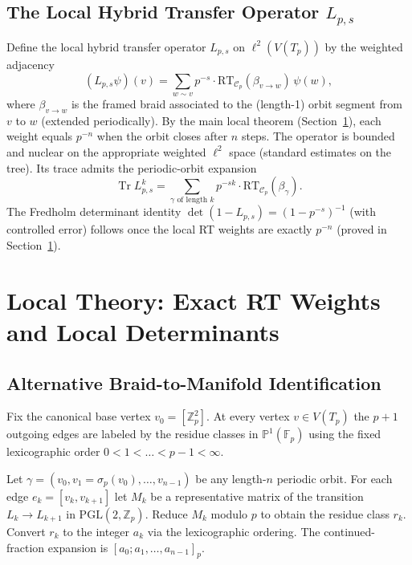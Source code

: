 \documentclass[11pt,a4paper]{amsart}
\begin{document}
\subsection{The Local Hybrid Transfer Operator \(L_{p,s}\)}
\label{subsec:local-operator}

Define the local hybrid transfer operator \(L_{p,s}\) on \(\ell^2(V(T_p))\) by the weighted adjacency
\[
(L_{p,s}\psi)(v)=\sum_{w\sim v}p^{-s}\cdot\mathrm{RT}_{\mathcal{C}_p}(\beta_{v\to w})\,\psi(w),
\]
where \(\beta_{v\to w}\) is the framed braid associated to the (length-1) orbit segment from \(v\) to \(w\) (extended periodically). By the main local theorem (Section~\ref{sec:local-theory}), each weight equals \(p^{-n}\) when the orbit closes after \(n\) steps. The operator is bounded and nuclear on the appropriate weighted \(\ell^2\) space (standard estimates on the tree). Its trace admits the periodic-orbit expansion
\[
\operatorname{Tr} L_{p,s}^k=\sum_{\gamma\text{ of length }k}p^{-sk}\cdot\mathrm{RT}_{\mathcal{C}_p}(\beta_\gamma).
\]
The Fredholm determinant identity \(\det(1-L_{p,s})=(1-p^{-s})^{-1}\) (with controlled error) follows once the local RT weights are exactly \(p^{-n}\) (proved in Section~\ref{sec:local-theory}).

\section{Local Theory: Exact RT Weights and Local Determinants}
\label{sec:local-theory}

\subsection{Alternative Braid-to-Manifold Identification}
\label{subsec:alt-id}

Fix the canonical base vertex \(v_0 = [\mathbb{Z}_p^2]\). At every vertex \(v \in V(T_p)\) the \(p+1\) outgoing edges are labeled by the residue classes in \(\mathbb{P}^1(\mathbb{F}_p)\) using the fixed lexicographic order \(0 < 1 < \dots < p-1 < \infty\).

Let \(\gamma = (v_0, v_1 = \sigma_p(v_0), \dots, v_{n-1})\) be any length-\(n\) periodic orbit. For each edge \(e_k = [v_k, v_{k+1}]\) let \(M_k\) be a representative matrix of the transition \(L_k \to L_{k+1}\) in \(\mathrm{PGL}(2,\mathbb{Z}_p)\). Reduce \(M_k\) modulo \(p\) to obtain the residue class \(r_k\). Convert \(r_k\) to the integer \(a_k\) via the lexicographic ordering. The continued-fraction expansion is \([a_0; a_1, \dots, a_{n-1}]_p\).
\end{document}
